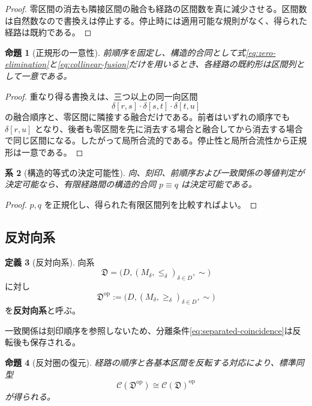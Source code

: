 \documentclass[a4paper,11pt]{ltjsarticle}
\theoremstyle{definition}
\newtheorem{definition}{定義}[section]
\theoremstyle{plain}
\newtheorem{proposition}[definition]{命題}
\newtheorem{corollary}[definition]{系}
\begin{document}
\begin{proof}
零区間の消去も隣接区間の融合も経路の区間数を真に減少させる。区間数は自然数なので書換えは停止する。停止時には適用可能な規則がなく、得られた経路は既約である。
\end{proof}

\begin{proposition}[正規形の一意性]
前順序を固定し、構造的合同として式\eqref{eq:zero-elimination}と\eqref{eq:collinear-fusion}だけを用いるとき、各経路の既約形は区間列として一意である。
\end{proposition}

\begin{proof}
重なり得る書換えは、三つ以上の同一向区間
\[
 \delta[r,s]\cdot\delta[s,t]\cdot\delta[t,u]
\]
の融合順序と、零区間に隣接する融合だけである。前者はいずれの順序でも $\delta[r,u]$ となり、後者も零区間を先に消去する場合と融合してから消去する場合で同じ区間になる。したがって局所合流的である。停止性と局所合流性から正規形は一意である。
\end{proof}

\begin{corollary}[構造的等式の決定可能性]
向、刻印、前順序および一致関係の等値判定が決定可能なら、有限経路間の構造的合同 $p\equiv q$ は決定可能である。
\end{corollary}

\begin{proof}
$p,q$ を正規化し、得られた有限区間列を比較すればよい。
\end{proof}

\subsection{反対向系}

\begin{definition}[反対向系]
向系
\[
 \mathfrak D=
 \bigl(D,(M_\delta,\leq_\delta)_{\delta\in D},\sim\bigr)
\]
に対し
\begin{equation}
 \mathfrak D^{\mathrm{op}}
 :=
 \bigl(D,(M_\delta,\geq_\delta)_{\delta\in D},\sim\bigr)
 \label{eq:opposite-direction-system}
\end{equation}
を\textbf{反対向系}と呼ぶ。
\end{definition}

一致関係は刻印順序を参照しないため、分離条件\eqref{eq:separated-coincidence}は反転後も保存される。

\begin{proposition}[反対圏の復元]
経路の順序と各基本区間を反転する対応により、標準同型
\begin{equation}
 \mathcal C(\mathfrak D^{\mathrm{op}})
 \cong
 \mathcal C(\mathfrak D)^{\mathrm{op}}
 \label{eq:opposite-reconstruction}
\end{equation}
が得られる。
\end{proposition}
\end{document}
